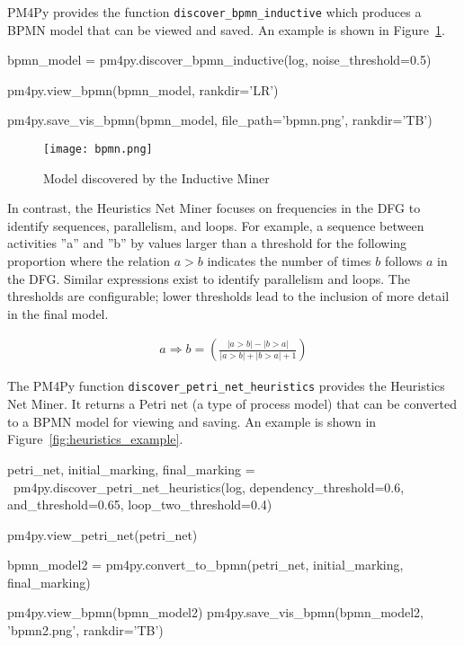 PM4Py provides the function \texttt{discover\_bpmn\_inductive} which produces a BPMN model that can be viewed and saved. An example is shown in Figure~\ref{fig:inductive_example}.

\begin{pythoncode}
bpmn_model = pm4py.discover_bpmn_inductive(log, noise_threshold=0.5)

pm4py.view_bpmn(bpmn_model, rankdir='LR')

pm4py.save_vis_bpmn(bpmn_model, file_path='bpmn.png', rankdir='TB')
\end{pythoncode}

\begin{figure}
\centering
\texttt{[image: bpmn.png]}
\caption{Model discovered by the Inductive Miner}
\label{fig:inductive_example}
\end{figure}

In contrast, the Heuristics Net Miner  focuses on frequencies in the DFG to identify sequences, parallelism, and loops. For example, a sequence between activities ''a'' and ''b'' by values larger than a threshold for the following proportion where the relation $a > b$ indicates the number of times $b$ follows $a$ in the DFG. Similar expressions exist to identify parallelism and loops. The thresholds are configurable; lower thresholds lead to the inclusion of more detail in the final model.

\begin{align*}
a \Rightarrow b = \left( \frac{
| a > b| - |b > a|}{
| a > b| + |b > a| + 1}\right)
\end{align*}
 
The PM4Py function \texttt{discover\_petri\_net\_heuristics} provides the Heuristics Net Miner. It returns a Petri net (a type of process model) that can be converted to a BPMN model for viewing and saving. An example is shown in Figure~\ref{fig:heuristics_example}.

\begin{pythoncode}
petri_net, initial_marking, final_marking = \
    pm4py.discover_petri_net_heuristics(log, 
        dependency_threshold=0.6,
        and_threshold=0.65,
        loop_two_threshold=0.4)
        
pm4py.view_petri_net(petri_net)
        
bpmn_model2 = pm4py.convert_to_bpmn(petri_net, 
    initial_marking, final_marking)
    
pm4py.view_bpmn(bpmn_model2)
pm4py.save_vis_bpmn(bpmn_model2, 'bpmn2.png', rankdir='TB')
\end{pythoncode}

